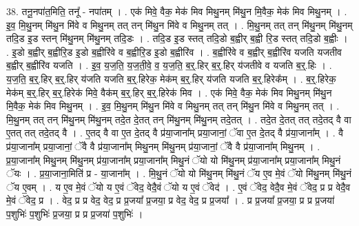 \documentclass[17pt]{extarticle}
\begin{document}
38. तनू॒नपा॑त॒मिति॒ तनू᳚ - नपा॑तम् । . एक॑ मिवे॒ वैक॒ मेक॑ मिव मिथु॒नम् मि॑थु॒न मि॒वैक॒ मेक॑ मिव मिथु॒नम् । . इ॒व॒ मि॒थु॒नम् मि॑थु॒न मि॑वे व मिथु॒नम् तत् तन् मि॑थु॒न मि॑वे व मिथु॒नम् तत् । . मि॒थु॒नम् तत् तन् मि॑थु॒नम् मि॑थु॒नम् तदि॒ड इ॒ड स्तन् मि॑थु॒नम् मि॑थु॒नम् तदि॒डः । . तदि॒ड इ॒ड स्तत् तदि॒डो ब॒ह्वीर् ब॒ह्वी रि॒ड स्तत् तदि॒डो ब॒ह्वीः । . इ॒डो ब॒ह्वीर् ब॒ह्वीरि॒ड इ॒डो ब॒ह्वीरि॑वे व ब॒ह्वीरि॒ड इ॒डो ब॒ह्वीरि॑व । . ब॒ह्वीरि॑वे व ब॒ह्वीर् ब॒ह्वीरि॑व यजति यजतीव ब॒ह्वीर् ब॒ह्वीरि॑व यजति । . इ॒व॒ य॒ज॒ति॒ य॒ज॒ती॒वे॒ व॒ य॒ज॒ति॒ ब॒र्॒.हिर् ब॒र्॒.हिर् य॑जतीवे व यजति ब॒र्॒.हिः । . य॒ज॒ति॒ ब॒र्॒.हिर् ब॒र्॒.हिर् य॑जति यजति ब॒र्॒.हिरेक॒ मेक॑म् ब॒र्॒.हिर् य॑जति यजति ब॒र्॒.हिरेक᳚म् । . ब॒र्॒.हिरेक॒ मेक॑म् ब॒र्॒.हिर् ब॒र्॒.हिरेक॑ मिवे॒ वैक॑म् ब॒र्॒.हिर् ब॒र्॒.हिरेक॑ मिव । . एक॑ मिवे॒ वैक॒ मेक॑ मिव मिथु॒नम् मि॑थु॒न मि॒वैक॒ मेक॑ मिव मिथु॒नम् । . इ॒व॒ मि॒थु॒नम् मि॑थु॒न मि॑वे व मिथु॒नम् तत् तन् मि॑थु॒न मि॑वे व मिथु॒नम् तत् । . मि॒थु॒नम् तत् तन् मि॑थु॒नम् मि॑थु॒नम् तदे॒त दे॒तत् तन् मि॑थु॒नम् मि॑थु॒नम् तदे॒तत् । . तदे॒त दे॒तत् तत् तदे॒तद् वै वा ए॒तत् तत् तदे॒तद् वै । . ए॒तद् वै वा ए॒त दे॒तद् वै प्र॑या॒जाना᳚म् प्रया॒जानां॒ ॅवा ए॒त दे॒तद् वै प्र॑या॒जाना᳚म् । . वै प्र॑या॒जाना᳚म् प्रया॒जानां॒ ॅवै वै प्र॑या॒जाना᳚म् मिथु॒नम् मि॑थु॒नम् प्र॑या॒जानां॒ ॅवै वै प्र॑या॒जाना᳚म् मिथु॒नम् । . प्र॒या॒जाना᳚म् मिथु॒नम् मि॑थु॒नम् प्र॑या॒जाना᳚म् प्रया॒जाना᳚म् मिथु॒नं ॅयो यो मि॑थु॒नम् प्र॑या॒जाना᳚म् प्रया॒जाना᳚म् मिथु॒नं ॅयः । . प्र॒या॒जाना॒मिति॑ प्र - या॒जाना᳚म् । . मि॒थु॒नं ॅयो यो मि॑थु॒नम् मि॑थु॒नं ॅय ए॒व मे॒वं ॅयो मि॑थु॒नम् मि॑थु॒नं ॅय ए॒वम् । . य ए॒व मे॒वं ॅयो य ए॒वं ॅवेद॒ वेदै॒वं ॅयो य ए॒वं ॅवेद॑ । . ए॒वं ॅवेद॒ वेदै॒व मे॒वं ॅवेद॒ प्र प्र वेदै॒व मे॒वं ॅवेद॒ प्र । . वेद॒ प्र प्र वेद॒ वेद॒ प्र प्र॒जया᳚ प्र॒जया॒ प्र वेद॒ वेद॒ प्र प्र॒जया᳚ । . प्र प्र॒जया᳚ प्र॒जया॒ प्र प्र प्र॒जया॑ प॒शुभिः॑ प॒शुभिः॑ प्र॒जया॒ प्र प्र प्र॒जया॑ प॒शुभिः॑ । \newline
\pagebreak
{}
\end{document}
